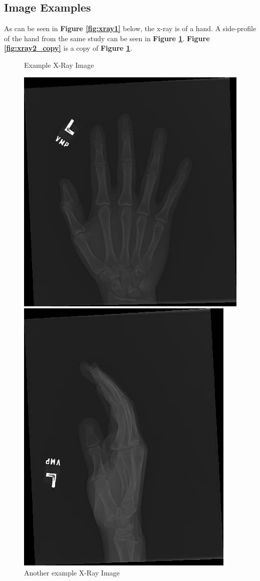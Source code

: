 \documentclass[11pt]{article} %
\theoremstyle{plain}
\theoremstyle{definition}
\begin{document}
\subsection{Image Examples}
As can be seen in \textbf{Figure \ref{fig:xray1}} below, the x-ray is of a hand. A side-profile of the hand from the same study can be seen in \textbf{Figure \ref{fig:xray2}}. \textbf{Figure \ref{fig:xray2_copy}} is a copy of \textbf{Figure \ref{fig:xray2}}.

\begin{figure}
  \centering    
  \caption{Example X-Ray Image}
  \label{fig:xray1}
  \includegraphics[scale=0.5]{image1.png}
  \caption{Another example X-Ray Image}
  \label{fig:xray2}
  \includegraphics[scale=0.5]{image2.png}

\end{figure}
\end{document}
